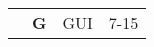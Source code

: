 \documentclass[twocolumn]{article}
\begin{document}
\begin{tabular}{ | >{\bfseries}m{0.5em} | >{\bfseries}m{1em} | m{12em} | m{8em} |} \cline{1-4}
\multirow{54}{0.5em}{- \newline  \newline  \newline  \newline  \newline - \newline  \newline  \newline  \newline  \newline - \newline  \newline  \newline  \newline  \newline - \newline  \newline  \newline  \newline  \newline - \newline  \newline  \newline  \newline  \newline - \newline  \newline  \newline  \newline  \newline - \newline  \newline  \newline  \newline  \newline - \newline  \newline  \newline  \newline  \newline - \newline  \newline  \newline  \newline  \newline - \newline  \newline  \newline  \newline  \newline -} & G & GUI & 7-15\\ \cline{2-4}

\end{tabular}
\end{document}
